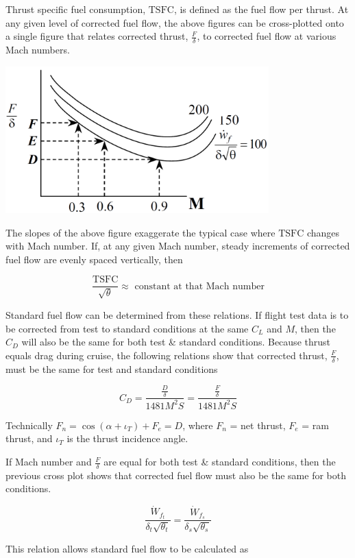 \documentclass[
]{book}
\begin{document}
Thrust specific fuel consumption, \(\mathrm{TSFC}\), is defined as the fuel flow
per thrust. At any given level of corrected fuel flow, the above figures can be
cross-plotted onto a single figure that relates corrected thrust,
\(\frac{F}{\delta}\), to corrected fuel flow at various Mach numbers.

\includegraphics[width=4in,height=\textheight]{media/12/corr-thrust-m.png}

The slopes of the above figure exaggerate the typical case where
\(\mathrm{TSFC}\) changes with Mach number. If, at any given Mach number, steady
increments of corrected fuel flow are evenly spaced vertically, then

\[
\frac{\mathrm{TSFC}}{\sqrt{\theta}} \approx \text{ constant at that Mach number}
\]

Standard fuel flow can be determined from these relations. If flight test data
is to be corrected from test to standard conditions at the same \(C_L\) and
\(M\), then the \(C_D\) will also be the same for both test \& standard
conditions. Because thrust equals drag during cruise, the following relations
show that corrected thrust, \(\frac{F}{\delta}\), must be the same for test and standard conditions

\[
C_D = \frac{\frac{D}{\delta}}{1481 M^2 S} = \frac{\frac{F}{\delta}}{1481 M^2 S}
\]

Technically \(F_n = \cos \left( \alpha + \iota_T \right) + F_e = D\), where
\(F_n\) = net thrust, \(F_e\) = ram thrust, and \(\iota_T\) is the thrust
incidence angle.

If Mach number and \(\frac{F}{\delta}\) are equal for both test \& standard
conditions, then the previous cross plot shows that corrected fuel flow must
also be the same for both conditions.

\[
\frac{\dot{W}_{f_t}}{\delta_t \sqrt{\theta_t}} = \frac{\dot{W}_{f_s}}{\delta_s \sqrt{\theta_s}}
\]

This relation allows standard fuel flow to be calculated as
\end{document}
